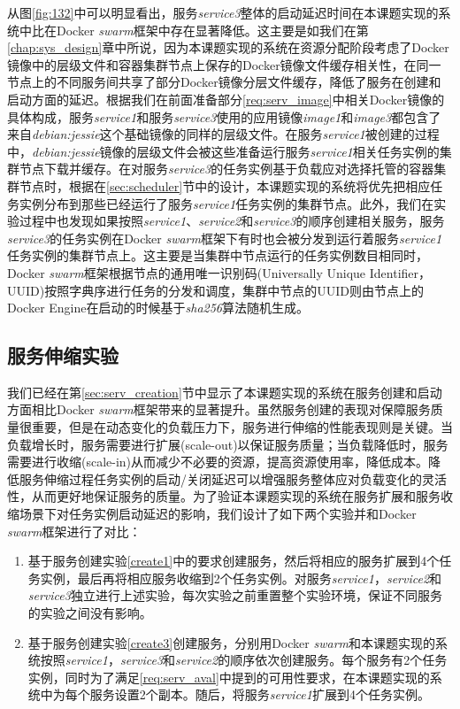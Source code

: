 从图\ref{fig:132}中可以明显看出，服务\emph{service3}整体的启动延迟时间在本课题实现的系统中比在Docker \emph{swarm}框架中存在显著降低。这主要是如我们在第\ref{chap:sys_design}章中所说，因为本课题实现的系统在资源分配阶段考虑了Docker镜像中的层级文件和容器集群节点上保存的Docker镜像文件缓存相关性，在同一节点上的不同服务间共享了部分Docker镜像分层文件缓存，降低了服务在创建和启动方面的延迟。根据我们在前面准备部分\ref{req:serv_image}中相关Docker镜像的具体构成，服务\emph{service1}和服务\emph{service3}使用的应用镜像\emph{image1}和\emph{image3}都包含了来自\emph{debian:jessie}这个基础镜像的同样的层级文件。在服务\emph{service1}被创建的过程中，\emph{debian:jessie}镜像的层级文件会被这些准备运行服务\emph{service1}相关任务实例的集群节点下载并缓存。在对服务\emph{service3}的任务实例基于负载应对选择托管的容器集群节点时，根据在\ref{sec:scheduler}节中的设计，本课题实现的系统将优先把相应任务实例分布到那些已经运行了服务\emph{service1}任务实例的集群节点。此外，我们在实验过程中也发现如果按照\emph{service1}、\emph{service2}和\emph{service3}的顺序创建相关服务，服务\emph{service3}的任务实例在Docker \emph{swarm}框架下有时也会被分发到运行着服务\emph{service1}任务实例的集群节点上。这主要是当集群中节点运行的任务实例数目相同时，Docker \emph{swarm}框架根据节点的通用唯一识别码(Universally Unique Identifier，UUID)按照字典序进行任务的分发和调度，集群中节点的UUID则由节点上的Docker Engine在启动的时候基于\emph{sha256}算法随机生成。

\subsection{服务伸缩实验}\label{sec:serv_scale}
我们已经在第\ref{sec:serv_creation}节中显示了本课题实现的系统在服务创建和启动方面相比Docker \emph{swarm}框架带来的显著提升。虽然服务创建的表现对保障服务质量很重要，但是在动态变化的负载压力下，服务进行伸缩的性能表现则是关键。当负载增长时，服务需要进行扩展(scale-out)以保证服务质量；当负载降低时，服务需要进行收缩(scale-in)从而减少不必要的资源，提高资源使用率，降低成本。降低服务伸缩过程任务实例的启动/关闭延迟可以增强服务整体应对负载变化的灵活性，从而更好地保证服务的质量。为了验证本课题实现的系统在服务扩展和服务收缩场景下对任务实例启动延迟的影响，我们设计了如下两个实验并和Docker \emph{swarm}框架进行了对比：
\begin{enumerate}
\item\label{scale1} 基于服务创建实验\ref{create1}中的要求创建服务，然后将相应的服务扩展到4个任务实例，最后再将相应服务收缩到2个任务实例。对服务\emph{service1}，\emph{service2}和\emph{service3}独立进行上述实验，每次实验之前重置整个实验环境，保证不同服务的实验之间没有影响。
\item\label{scale2} 基于服务创建实验\ref{create3}创建服务，分别用Docker \emph{swarm}和本课题实现的系统按照\emph{service1}，\emph{service3}和\emph{service2}的顺序依次创建服务。每个服务有2个任务实例，同时为了满足\ref{req:serv_aval}中提到的可用性要求，在本课题实现的系统中为每个服务设置2个副本。随后，将服务\emph{service1}扩展到4个任务实例。
\end{enumerate}

